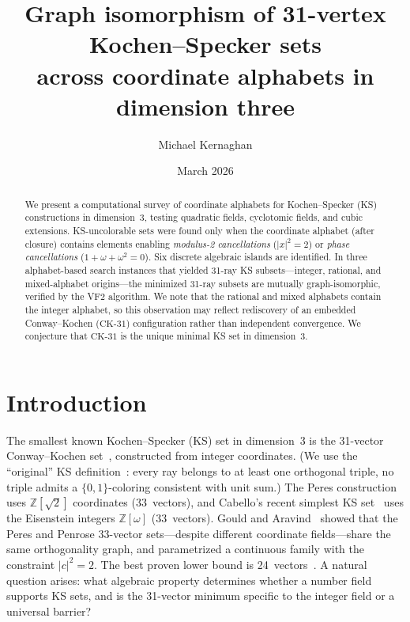 \documentclass[twocolumn,prl,superscriptaddress,nofootinbib]{revtex4-2}
\newcommand{\Z}{\mathbb{Z}}
\newcommand{\CK}{\mathrm{CK}\text{-}31}
\begin{document}
\title{Graph isomorphism of 31-vertex Kochen--Specker sets\\across coordinate alphabets in dimension three}

\author{Michael Kernaghan}

\date{March 2026}

\begin{abstract}
We present a computational survey of coordinate alphabets for Kochen--Specker (KS) constructions in dimension~3, testing quadratic fields, cyclotomic fields, and cubic extensions. KS-uncolorable sets were found only when the coordinate alphabet (after closure) contains elements enabling \emph{modulus-2 cancellations} ($|x|^2 = 2$) or \emph{phase cancellations} ($1 + \omega + \omega^2 = 0$). Six discrete algebraic islands are identified. In three alphabet-based search instances that yielded 31-ray KS subsets---integer, rational, and mixed-alphabet origins---the minimized 31-ray subsets are mutually graph-isomorphic, verified by the VF2 algorithm. We note that the rational and mixed alphabets contain the integer alphabet, so this observation may reflect rediscovery of an embedded Conway--Kochen ($\CK$) configuration rather than independent convergence. We conjecture that $\CK$ is the unique minimal KS set in dimension~3.
\end{abstract}

\maketitle

\section{Introduction}

The smallest known Kochen--Specker (KS) set in dimension~3 is the 31-vector Conway--Kochen set~\cite{ConwayKochen,Peres1993}, constructed from integer coordinates.  (We use the ``original'' KS definition~\cite{LiBrightGanesh2024}: every ray belongs to at least one orthogonal triple, no triple admits a $\{0,1\}$-coloring consistent with unit sum.)  The Peres construction~\cite{Peres1991} uses $\Z[\sqrt{2}]$ coordinates (33~vectors), and Cabello's recent simplest KS set~\cite{Cabello2025simplest} uses the Eisenstein integers $\Z[\omega]$ (33~vectors).  Gould and Aravind~\cite{GouldAravind2010} showed that the Peres and Penrose 33-vector sets---despite different coordinate fields---share the same orthogonality graph, and parametrized a continuous family with the constraint $|c|^2 = 2$.  The best proven lower bound is 24~vectors~\cite{LiBrightGanesh2024,KirchwegarPeitlSzeider2023}. A natural question arises: what algebraic property determines whether a number field supports KS sets, and is the 31-vector minimum specific to the integer field or a universal barrier?
\end{document}
